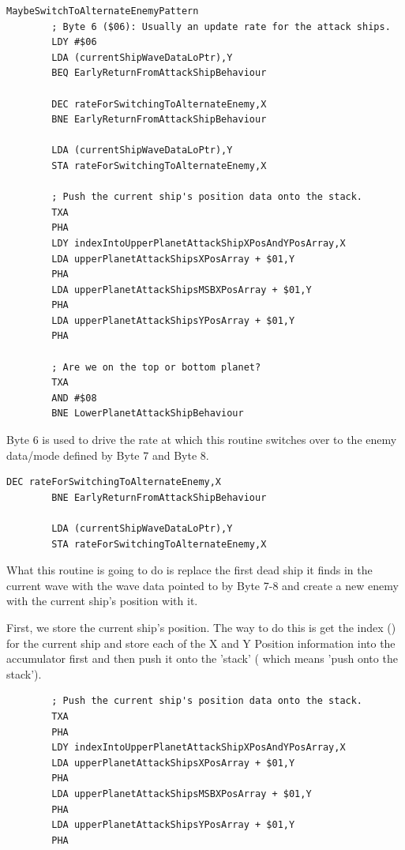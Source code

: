 \begin{lstlisting}[caption=Byte 6 is used to periodically switch to an enemy mode defined by Bytes 7-8 ]
MaybeSwitchToAlternateEnemyPattern   
        ; Byte 6 ($06): Usually an update rate for the attack ships.
        LDY #$06
        LDA (currentShipWaveDataLoPtr),Y
        BEQ EarlyReturnFromAttackShipBehaviour

        DEC rateForSwitchingToAlternateEnemy,X
        BNE EarlyReturnFromAttackShipBehaviour

        LDA (currentShipWaveDataLoPtr),Y
        STA rateForSwitchingToAlternateEnemy,X

        ; Push the current ship's position data onto the stack.
        TXA
        PHA
        LDY indexIntoUpperPlanetAttackShipXPosAndYPosArray,X
        LDA upperPlanetAttackShipsXPosArray + $01,Y
        PHA
        LDA upperPlanetAttackShipsMSBXPosArray + $01,Y
        PHA
        LDA upperPlanetAttackShipsYPosArray + $01,Y
        PHA

        ; Are we on the top or bottom planet?
        TXA
        AND #$08
        BNE LowerPlanetAttackShipBehaviour

\end{lstlisting}

Byte 6 is used to drive the rate at which this routine switches over to the enemy data/mode defined by Byte 7 and Byte 8.

\begin{lstlisting}[caption=\icode{rateForSwitchingToAlternateEnemy} (Byte 6) is decremented and reloaded each time it reaches zero. ]
        DEC rateForSwitchingToAlternateEnemy,X
        BNE EarlyReturnFromAttackShipBehaviour

        LDA (currentShipWaveDataLoPtr),Y
        STA rateForSwitchingToAlternateEnemy,X
\end{lstlisting}

What this routine is going to do is replace the first dead ship it finds in the current wave with the wave data pointed to by  Byte 7-8
and create a new enemy with the current ship's position with it.

First, we store the current ship's position. The way to do this is get the index () for the current ship  and store
each of the X and Y Position information into the accumulator first  and then push it onto the 'stack' ( which means
'push  onto the stack').

\begin{lstlisting}
        ; Push the current ship's position data onto the stack.
        TXA
        PHA
        LDY indexIntoUpperPlanetAttackShipXPosAndYPosArray,X
        LDA upperPlanetAttackShipsXPosArray + $01,Y
        PHA
        LDA upperPlanetAttackShipsMSBXPosArray + $01,Y
        PHA
        LDA upperPlanetAttackShipsYPosArray + $01,Y
        PHA
\end{lstlisting}

